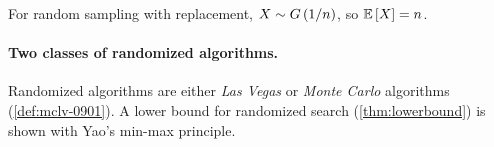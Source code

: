 For random sampling with replacement, $X \sim G\left(1/n\right)$, so
$\expectation{X} = n$.

\paragraph{Two classes of randomized algorithms.} Randomized algorithms are either \emph{Las Vegas}
or \emph{Monte Carlo} algorithms (\cref{def:mclv-0901}). A lower bound for randomized search
(\cref{thm:lowerbound}) is shown with Yao's min-max principle.
